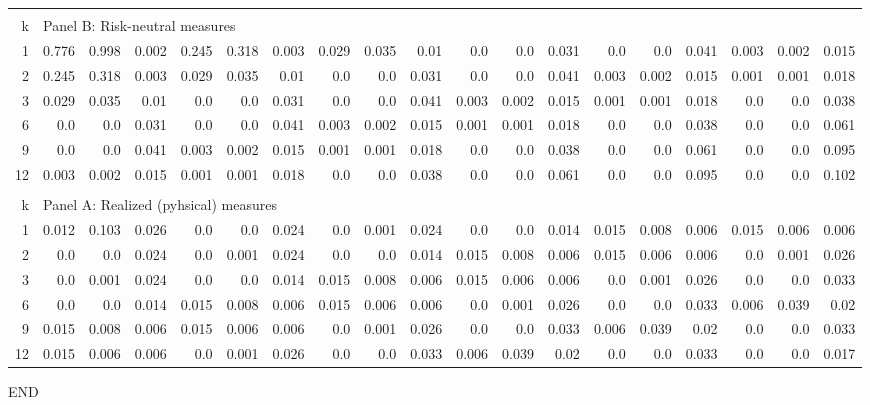\documentclass{article}
\begin{document}
\begin{landscape}
\begin{center}
\begin{tabular}{@{\extracolsep{5pt}}rrrrrrrrrrrrrrrrrrr@{}}
\hline\\[0.000000001pt]

k & \multicolumn{18}{l}{Panel B: Risk-neutral measures} \\[7pt]

\hline

1 & 0.776 & 0.998 & 0.002 & 0.245 & 0.318 & 0.003 & 0.029 & 0.035 & 0.01 & 0.0 & 0.0 & 0.031 & 0.0 & 0.0 & 0.041 & 0.003 & 0.002 & 0.015 \\[6pt]
2 & 0.245 & 0.318 & 0.003 & 0.029 & 0.035 & 0.01 & 0.0 & 0.0 & 0.031 & 0.0 & 0.0 & 0.041 & 0.003 & 0.002 & 0.015 & 0.001 & 0.001 & 0.018 \\[6pt]
3 & 0.029 & 0.035 & 0.01 & 0.0 & 0.0 & 0.031 & 0.0 & 0.0 & 0.041 & 0.003 & 0.002 & 0.015 & 0.001 & 0.001 & 0.018 & 0.0 & 0.0 & 0.038 \\[6pt]
6 & 0.0 & 0.0 & 0.031 & 0.0 & 0.0 & 0.041 & 0.003 & 0.002 & 0.015 & 0.001 & 0.001 & 0.018 & 0.0 & 0.0 & 0.038 & 0.0 & 0.0 & 0.061 \\[6pt]
9 & 0.0 & 0.0 & 0.041 & 0.003 & 0.002 & 0.015 & 0.001 & 0.001 & 0.018 & 0.0 & 0.0 & 0.038 & 0.0 & 0.0 & 0.061 & 0.0 & 0.0 & 0.095 \\[6pt]
12 & 0.003 & 0.002 & 0.015 & 0.001 & 0.001 & 0.018 & 0.0 & 0.0 & 0.038 & 0.0 & 0.0 & 0.061 & 0.0 & 0.0 & 0.095 & 0.0 & 0.0 & 0.102 \\[6pt]

\hline\\[0.000000001pt]

k & \multicolumn{18}{l}{Panel A: Realized (pyhsical) measures} \\[7pt]

\hline

1 & 0.012 & 0.103 & 0.026 & 0.0 & 0.0 & 0.024 & 0.0 & 0.001 & 0.024 & 0.0 & 0.0 & 0.014 & 0.015 & 0.008 & 0.006 & 0.015 & 0.006 & 0.006 \\[6pt]
2 & 0.0 & 0.0 & 0.024 & 0.0 & 0.001 & 0.024 & 0.0 & 0.0 & 0.014 & 0.015 & 0.008 & 0.006 & 0.015 & 0.006 & 0.006 & 0.0 & 0.001 & 0.026 \\[6pt]
3 & 0.0 & 0.001 & 0.024 & 0.0 & 0.0 & 0.014 & 0.015 & 0.008 & 0.006 & 0.015 & 0.006 & 0.006 & 0.0 & 0.001 & 0.026 & 0.0 & 0.0 & 0.033 \\[6pt]
6 & 0.0 & 0.0 & 0.014 & 0.015 & 0.008 & 0.006 & 0.015 & 0.006 & 0.006 & 0.0 & 0.001 & 0.026 & 0.0 & 0.0 & 0.033 & 0.006 & 0.039 & 0.02 \\[6pt]
9 & 0.015 & 0.008 & 0.006 & 0.015 & 0.006 & 0.006 & 0.0 & 0.001 & 0.026 & 0.0 & 0.0 & 0.033 & 0.006 & 0.039 & 0.02 & 0.0 & 0.0 & 0.033 \\[6pt]
12 & 0.015 & 0.006 & 0.006 & 0.0 & 0.001 & 0.026 & 0.0 & 0.0 & 0.033 & 0.006 & 0.039 & 0.02 & 0.0 & 0.0 & 0.033 & 0.0 & 0.0 & 0.017 \\[6pt]

\hline

\end{tabular}
\end{center}
\end{landscape}

\restoregeometry

END
\end{document}
